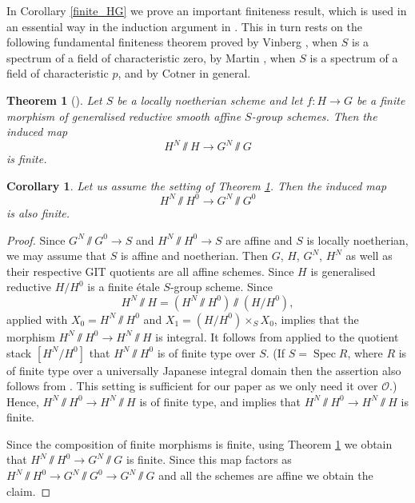 \documentclass{amsart}
\newtheorem{cor}[prop]{Corollary}
\newtheorem{thm}[prop]{Theorem}
\theoremstyle{definition}
\theoremstyle{remark}
\DeclareMathOperator{\Spec}{Spec}
\newcommand{\OO}{\mathcal O}
\begin{document}
In Corollary \ref{finite_HG} we prove an important finiteness result, which is used 
in an essential way in the induction argument in . This in turn rests on the following 
fundamental finiteness theorem proved by Vinberg \cite{vinberg}, when $S$ is a spectrum of a field of characteristic zero, 
by Martin \cite{martin}, when $S$ is a spectrum of a field of characteristic $p$, and by Cotner \cite{cotner}
in general.


\begin{thm}[\cite{cotner}]\label{cotner_main} Let $S$ be a locally noetherian scheme and let $f: H\rightarrow G$ be a finite morphism 
of generalised reductive smooth affine $S$-group schemes. Then the induced map 
$$ H^N\sslash H \rightarrow G^N \sslash G$$
is finite.
\end{thm}




\begin{cor}\label{cor_cotner} Let us assume the setting of Theorem \ref{cotner_main}. Then the induced map
$$ H^N\sslash H^0 \rightarrow G^N \sslash G^0$$
is also finite.
\end{cor}
\begin{proof} Since $G^N\sslash G^0 \rightarrow S$ and $H^N \sslash H^0 \rightarrow S$ are affine and $S$ is locally noetherian, 
we may assume that $S$ is affine and noetherian. Then $G$, $H$, $G^N$, $H^N$ as well 
as their respective GIT quotients are all 
affine schemes. Since $H$ is generalised reductive $H/ H^0$ is a finite \'etale $S$-group scheme. 
Since $$H^N\sslash H = (H^N \sslash H^0)\sslash (H/H^0),$$  
 \cite[Exp.\,V, Thm.\,4.1\,(ii)]{SGA3_new} applied with $X_0=H^N \sslash H^0$ and $X_1= (H/H^0)\times_S X_0$,
implies that the morphism $H^N \sslash H^0\rightarrow H^N\sslash H$ is integral. 
It follows from \cite[Theorem 6.3.3]{alper} applied to the quotient stack 
$[H^N/H^0]$ that $H^N\sslash H^0$ is of finite type over $S$. (If $S=\Spec R$, where
$R$ is of finite type over a universally Japanese integral domain then the assertion 
also follows from \cite[Theorem 2 (i)]{seshadri}. This setting is sufficient for 
our paper as we only need it over $\OO$.) Hence, $H^N\sslash H^0\rightarrow H^N\sslash H$ is of finite type, and \cite[\href{https://stacks.math.columbia.edu/tag/01WJ}{Tag 01WJ}]{stacks-project}
implies that $H^N \sslash H^0\rightarrow H^N\sslash H$ is finite. 


Since the composition of finite morphisms is finite, using 
Theorem \ref{cotner_main} we obtain that  $H^N \sslash H^0\rightarrow G^N\sslash G$ is finite. 
Since this map factors as $H^N \sslash H^0\rightarrow G^N\sslash G^0\rightarrow G^N\sslash G$
and all the schemes are affine we obtain the claim. 
\end{proof}
\end{document}
